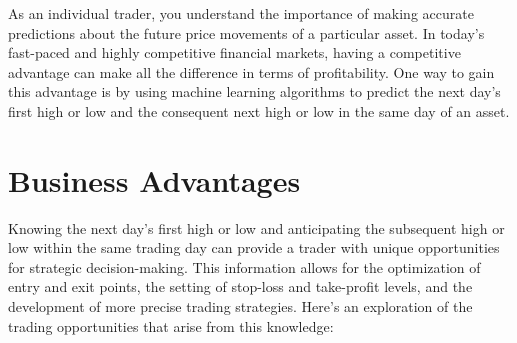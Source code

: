 \documentclass[
  letterpaper,
  DIV=11,
  numbers=noendperiod]{scrreprt}
\begin{document}

As an individual trader, you understand the importance of making
accurate predictions about the future price movements of a particular
asset. In today's fast-paced and highly competitive financial markets,
having a competitive advantage can make all the difference in terms of
profitability. One way to gain this advantage is by using machine
learning algorithms to predict the next day's first high or low and the
consequent next high or low in the same day of an asset.

\chapter*{Business Advantages}\label{business-advantages}


Knowing the next day's first high or low and anticipating the subsequent
high or low within the same trading day can provide a trader with unique
opportunities for strategic decision-making. This information allows for
the optimization of entry and exit points, the setting of stop-loss and
take-profit levels, and the development of more precise trading
strategies. Here's an exploration of the trading opportunities that
arise from this knowledge:
\end{document}
